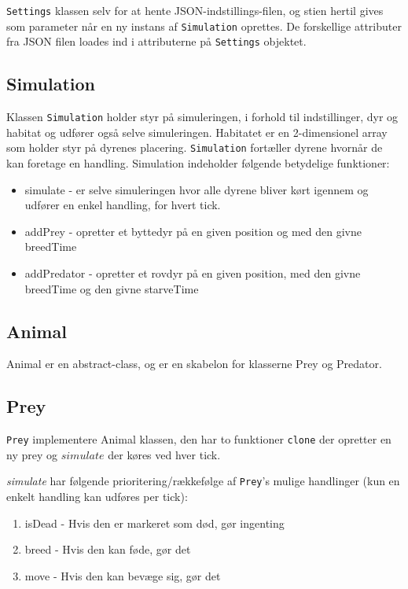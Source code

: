 \documentclass[a4paper]{article}
\begin{document}
      \texttt{Settings} klassen selv for at hente JSON-indstillings-filen, og 
      stien hertil gives som parameter når en ny instans af \texttt{Simulation} 
      oprettes.
      De forskellige attributer fra JSON filen loades ind i attributerne på \texttt{Settings} objektet.
    
    \subsection*{Simulation}
    Klassen \texttt{Simulation} holder styr på simuleringen, i forhold til indstillinger, dyr og habitat og udfører også selve simuleringen.
    Habitatet er en 2-dimensionel array som holder styr på dyrenes placering.
    \texttt{Simulation} fortæller dyrene hvornår de kan foretage en handling.   
    Simulation indeholder følgende betydelige funktioner:

    \begin{itemize}
      \item simulate - er selve simuleringen hvor alle dyrene bliver kørt igennem og udfører en enkel handling, for hvert tick.
      \item addPrey - opretter et byttedyr på en given position og med den givne breedTime
      \item addPredator - opretter et rovdyr på en given position, med den givne breedTime og den givne starveTime
    \end{itemize}
    
    \subsection*{Animal}
      Animal er en abstract-class, og er en skabelon for klasserne Prey og 
      Predator. 
    
    \subsection*{Prey}
      \texttt{Prey} implementere Animal klassen,
      den har to funktioner \lstinline$clone$ der opretter en ny prey
      og $simulate$ der køres ved hver tick.

      \textit{simulate} har følgende prioritering/rækkefølge af \texttt{Prey}'s mulige handlinger (kun en enkelt handling kan udføres per tick):

      \begin{enumerate}
        \item isDead - Hvis den er markeret som død, gør ingenting
        \item breed - Hvis den kan føde, gør det
        \item move - Hvis den kan bevæge sig, gør det
      \end{enumerate}
\end{document}

